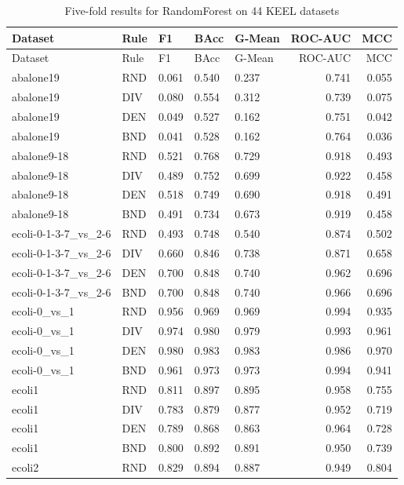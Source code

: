 \documentclass[10pt,a4paper]{article}
\begin{document}
\begingroup\small\setlength{\tabcolsep}{4pt}
\begin{longtable}{lllllrr}
\caption{Five-fold results for RandomForest on 44 KEEL datasets}\label{tab:s3}\\
\toprule
Dataset & Rule & F1 & BAcc & G-Mean & ROC-AUC & MCC \\
\midrule
\endfirsthead
\toprule
Dataset & Rule & F1 & BAcc & G-Mean & ROC-AUC & MCC \\
\midrule
\endhead
\bottomrule
\endlastfoot
abalone19 & RND & 0.061 & 0.540 & 0.237 & 0.741 & 0.055 \\
abalone19 & DIV & 0.080 & 0.554 & 0.312 & 0.739 & 0.075 \\
abalone19 & DEN & 0.049 & 0.527 & 0.162 & 0.751 & 0.042 \\
abalone19 & BND & 0.041 & 0.528 & 0.162 & 0.764 & 0.036 \\
abalone9-18 & RND & 0.521 & 0.768 & 0.729 & 0.918 & 0.493 \\
abalone9-18 & DIV & 0.489 & 0.752 & 0.699 & 0.922 & 0.458 \\
abalone9-18 & DEN & 0.518 & 0.749 & 0.690 & 0.918 & 0.491 \\
abalone9-18 & BND & 0.491 & 0.734 & 0.673 & 0.919 & 0.458 \\
ecoli-0-1-3-7\_vs\_2-6 & RND & 0.493 & 0.748 & 0.540 & 0.874 & 0.502 \\
ecoli-0-1-3-7\_vs\_2-6 & DIV & 0.660 & 0.846 & 0.738 & 0.871 & 0.658 \\
ecoli-0-1-3-7\_vs\_2-6 & DEN & 0.700 & 0.848 & 0.740 & 0.962 & 0.696 \\
ecoli-0-1-3-7\_vs\_2-6 & BND & 0.700 & 0.848 & 0.740 & 0.966 & 0.696 \\
ecoli-0\_vs\_1 & RND & 0.956 & 0.969 & 0.969 & 0.994 & 0.935 \\
ecoli-0\_vs\_1 & DIV & 0.974 & 0.980 & 0.979 & 0.993 & 0.961 \\
ecoli-0\_vs\_1 & DEN & 0.980 & 0.983 & 0.983 & 0.986 & 0.970 \\
ecoli-0\_vs\_1 & BND & 0.961 & 0.973 & 0.973 & 0.994 & 0.941 \\
ecoli1 & RND & 0.811 & 0.897 & 0.895 & 0.958 & 0.755 \\
ecoli1 & DIV & 0.783 & 0.879 & 0.877 & 0.952 & 0.719 \\
ecoli1 & DEN & 0.789 & 0.868 & 0.863 & 0.964 & 0.728 \\
ecoli1 & BND & 0.800 & 0.892 & 0.891 & 0.950 & 0.739 \\
ecoli2 & RND & 0.829 & 0.894 & 0.887 & 0.949 & 0.804 \\

\end{longtable}
\end{document}
